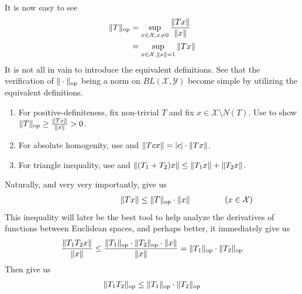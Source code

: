\documentclass{report}
\begin{document}
\begin{mdframed}
It is now easy to see 
\begin{align}
  \| T \|_{\text{op}}&=\sup_{x \in \mathcal{X},x\neq 0} \frac{\| Tx \|}{\| x \|}\label{equivdefopnorm1}\\
&=\sup_{x\in \mathcal{X},\| x \|=1} \| Tx \|\label{equivdefopnorm}
\end{align}
It is not all in vain to introduce the equivalent definitions. See that the verification of  $\| \cdot \|_{\text{op}}$ being a norm on $BL(\mathcal{X},\mathcal{Y})$ become simple by utilizing the equivalent definitions. 
\begin{enumerate}[label=(\alph*)]
  \item For positive-definiteness, fix non-trivial $T$ and fix $x\in \mathcal{X}\setminus N(T)$. Use  to show $\| T \|_{\text{op}}\geq \frac{\| Tx \|}{\| x \|}>0$. 
  \item For absolute homogenity, use  and $\| Tcx \|=\left|c\right|\cdot \| Tx \|$.
  \item For triangle inequality, use  and $\| (T_1+T_2)x \|\leq \| T_1x \|+\| T_2x \|$. 
\end{enumerate}
Naturally, and very very importantly,  give us 
\begin{align*}
\hspace{3cm}\norm{Tx}\leq \norm{T}_\text{op}\cdot \norm{x}\hspace{1.5cm}(x\in \mathcal{X})
\end{align*}
This inequality will later be the best tool to help analyze the derivatives of functions between Euclidean spaces, and perhaps better, it immediately give us 
\begin{align*}
 \frac{\| T_1T_2x \|}{\| x \|}\leq \frac{\| T_1 \|_\text{op}\cdot \| T_2 \|_\text{op}\cdot \| x \|}{\| x \|}=\| T_1 \|_\text{op}\cdot \| T_2 \|_{\text{op}}
\end{align*}
Then  give us  
\begin{align*}
\| T_1T_2 \|_\text{op}\leq \| T_1 \|_\text{op}\cdot \| T_2 \|_\text{op}
\end{align*}
\end{mdframed}
\end{document}
